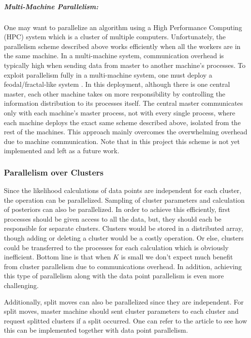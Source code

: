 \documentclass[12pt, a4paper]{article}
\begin{document}
\subparagraph{Multi-Machine Parallelism:} One may want to parallelize an algorithm using a High Performance Computing (HPC) system which is a cluster of multiple computers. Unfortunately, the parallelism scheme described above works efficiently when all the workers are in the same machine. In a multi-machine system, communication overhead is typically high when sending data from master to another machine's processes. To exploit parallelism fully in a multi-machine system, one must deploy a feodal/fractal-like system \cite{yu2016parallel}. In this deployment, although there is one central master, each other machine takes on more responsibility by controlling the information distribution to its processes itself. The central master communicates only with each machine's master process, not with every single process, where each machine deploys the exact same scheme described above, isolated from the rest of the machines. This approach mainly overcomes the overwhelming overhead due to machine communication. Note that in this project this scheme is not yet implemented and left as a future work.

\subsubsection{Parallelism over Clusters}
Since the likelihood calculations of data points are independent for each cluster, the operation can be parallelized. Sampling of cluster parameters and calculation of posteriors can also be parallelized. In order to achieve this efficiently, first processes should be given access to all the data, but, they should each be responsible for separate clusters. Clusters would be stored in a distributed array, though adding or deleting a cluster would be a costly operation. Or else, clusters could be transferred to the processes for each calculation which is obviously inefficient. Bottom line is that when $K$ is small we don't expect much benefit from cluster parallelism due to communications overhead. In addition, achieving this type of parallelism along with the data point parallelism is even more challenging.

Additionally, split moves can also be parallelized since they are independent. For split moves, master machine should sent cluster parameters to each cluster and request splitted clusters if a split occurred. One can refer to the article \cite{yu2016parallel} to see how this can be implemented together with data point parallelism.
\end{document}
